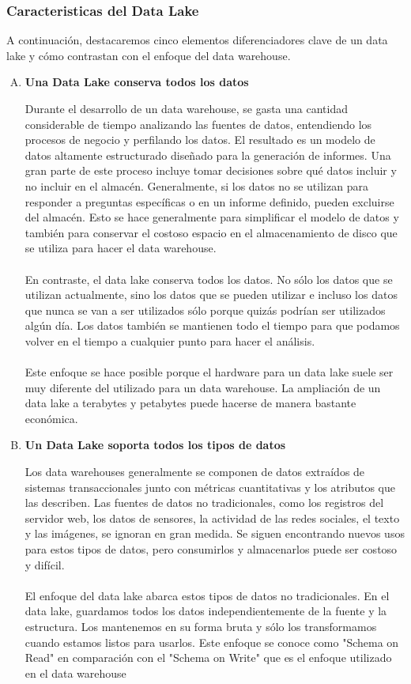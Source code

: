 \documentclass[11pt,a4paper]{article}
\begin{document}
			\subsubsection{Caracteristicas del Data Lake}
			
				A continuación, destacaremos cinco elementos diferenciadores clave de un data lake y cómo contrastan con el enfoque del data warehouse.
			
			\begin{enumerate}[A.]
				\item \textbf{Una Data Lake conserva todos los datos}
				
				Durante el desarrollo de un data warehouse, se gasta una cantidad considerable de tiempo analizando las fuentes de datos, entendiendo los procesos de negocio y perfilando los datos. El resultado es un modelo de datos altamente estructurado diseñado para la generación de informes. Una gran parte de este proceso incluye tomar decisiones sobre qué datos incluir y no incluir en el almacén. Generalmente, si los datos no se utilizan para responder a preguntas específicas o en un informe definido, pueden excluirse del almacén. Esto se hace generalmente para simplificar el modelo de datos y también para conservar el costoso espacio en el almacenamiento de disco que se utiliza para hacer el data warehouse.\\
				\\
				En contraste, el data lake conserva todos los datos. No sólo los datos que se utilizan actualmente, sino los datos que se pueden utilizar e incluso los datos que nunca se van a ser utilizados sólo porque quizás podrían ser utilizados algún día. Los datos también se mantienen todo el tiempo para que podamos volver en el tiempo a cualquier punto para hacer el análisis.\\
				\\
				Este enfoque se hace posible porque el hardware para un data lake suele ser muy diferente del utilizado para un data warehouse. La ampliación de un data lake a terabytes y petabytes puede hacerse de manera bastante económica.
				
				\item \textbf{Un Data Lake soporta todos los tipos de datos}
				
				Los data warehouses generalmente se componen de datos extraídos de sistemas transaccionales junto con métricas cuantitativas y los atributos que las describen. Las fuentes de datos no tradicionales, como los registros del servidor web, los datos de sensores, la actividad de las redes sociales, el texto y las imágenes, se ignoran en gran medida. Se siguen encontrando nuevos usos para estos tipos de datos, pero consumirlos y almacenarlos puede ser costoso y difícil.\\
				\\
				El enfoque del data lake abarca estos tipos de datos no tradicionales. En el data lake, guardamos todos los datos independientemente de la fuente y la estructura. Los mantenemos en su forma bruta y sólo los transformamos cuando estamos listos para usarlos. Este enfoque se conoce como "Schema on Read" en comparación con el "Schema on Write" que es el enfoque utilizado en el data warehouse
				

\end{enumerate}
\end{document}
